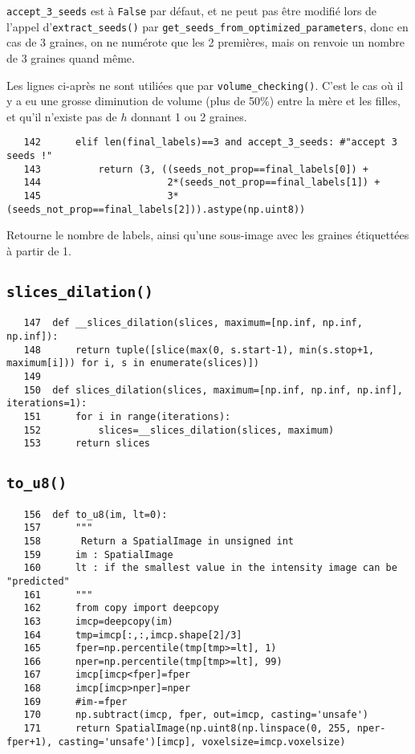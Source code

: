 \documentclass{article}
\def \mycolor {red}
\begin{document}
\color{\mycolor}
\verb|accept_3_seeds| est \`a \verb|False| par d\'efaut, et ne peut pas \^etre modifi\'e lors de l'appel d'\texttt{extract\_seeds()} par \texttt{get\_seeds\_from\_optimized\_parameters}, donc en cas de 3 graines, on ne num\'erote que les 2 premi\`eres, mais on renvoie un nombre de 3 graines quand m\^eme. 

Les lignes ci-apr\`es ne sont  utili\'ees que par \texttt{volume\_checking()}. C'est le cas o\`u il y a eu une grosse diminution de volume (plus de 50\%) entre la m\`ere et les filles, et qu'il n'existe pas de $h$ donnant 1 ou 2 graines.
\color{black}
\begin{verbatim}        
   142	    elif len(final_labels)==3 and accept_3_seeds: #"accept 3 seeds !"
   143	        return (3, ((seeds_not_prop==final_labels[0]) + 
   144	                    2*(seeds_not_prop==final_labels[1]) +
   145	                    3*(seeds_not_prop==final_labels[2])).astype(np.uint8))
\end{verbatim}
\color{\mycolor}
Retourne le nombre de labels, ainsi qu'une sous-image avec les graines \'etiquett\'ees \`a partir de 1.
\color{black}





\subsection{\texttt{slices\_dilation()}}
\label{sec:slices:dilation}
\begin{verbatim}
   147	def __slices_dilation(slices, maximum=[np.inf, np.inf, np.inf]):
   148	    return tuple([slice(max(0, s.start-1), min(s.stop+1, maximum[i])) for i, s in enumerate(slices)])
   149	
   150	def slices_dilation(slices, maximum=[np.inf, np.inf, np.inf], iterations=1):
   151	    for i in range(iterations):
   152	        slices=__slices_dilation(slices, maximum)
   153	    return slices    
\end{verbatim}





\subsection{\texttt{to\_u8()}}
\begin{verbatim}
   156	def to_u8(im, lt=0):
   157	    """
   158	     Return a SpatialImage in unsigned int
   159	    im : SpatialImage
   160	    lt : if the smallest value in the intensity image can be "predicted"
   161	    """
   162	    from copy import deepcopy
   163	    imcp=deepcopy(im)
   164	    tmp=imcp[:,:,imcp.shape[2]/3]
   165	    fper=np.percentile(tmp[tmp>=lt], 1)
   166	    nper=np.percentile(tmp[tmp>=lt], 99)
   167	    imcp[imcp<fper]=fper
   168	    imcp[imcp>nper]=nper
   169	    #im-=fper
   170	    np.subtract(imcp, fper, out=imcp, casting='unsafe')
   171	    return SpatialImage(np.uint8(np.linspace(0, 255, nper-fper+1), casting='unsafe')[imcp], voxelsize=imcp.voxelsize)
\end{verbatim}
\end{document}
